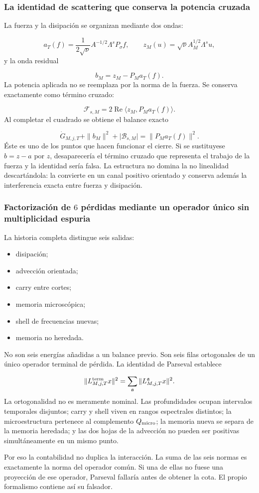 \subsubsection{La identidad de scattering que conserva la potencia cruzada}
La fuerza y la disipación se organizan mediante dos ondas:\par
\[
a_T(f)
=
\frac{1}{2\sqrt\nu}A^{-1/2}\Lambda^sP_\sigma f,
\qquad
z_M(u)=\sqrt\nu A_M^{1/2}\Lambda^su,
\]
y la onda residual\par
\[
b_M=z_M-P_Ma_T(f).
\]
La potencia aplicada no se reemplaza por la norma de la fuerza. Se conserva exactamente como término cruzado:\par
\[
\mathscr F_{s,M}
=
2\operatorname{Re}\langle z_M,P_Ma_T(f)\rangle.
\]
Al completar el cuadrado se obtiene el balance exacto\par
\[
\dot G_{M,j,T}
+\|b_M\|^2
+\lvert\mathscr B_{s,M}\rvert
=
\|P_Ma_T(f)\|^2.
\]
Éste es uno de los puntos que hacen funcionar el cierre. Si se sustituyese \(b=z-a\) por \(z\), desaparecería el término cruzado que representa el trabajo de la fuerza y la identidad sería falsa. La estructura no domina la no linealidad descartándola: la convierte en un canal positivo orientado y conserva además la interferencia exacta entre fuerza y disipación.\par
{}
\subsubsection{Factorización de \(6\) pérdidas mediante un operador único sin multiplicidad espuria}
La historia completa distingue seis salidas:\par
\begin{itemize}
\item disipación;
\item advección orientada;
\item carry entre cortes;
\item memoria microscópica;
\item shell de frecuencias nuevas;
\item memoria no heredada.
\end{itemize}
No son seis energías añadidas a un balance previo. Son seis filas ortogonales de un único operador terminal de pérdida. La identidad de Parseval establece\par
\[
\|L_{M,j,T}^{\rm term}x\|^2
=
\sum_{\mathfrak a}
\|L_{M,j,T}^{\mathfrak a}x\|^2.
\]
La ortogonalidad no es meramente nominal. Las profundidades ocupan intervalos temporales disjuntos; carry y shell viven en rangos espectrales distintos; la microestructura pertenece al complemento \(Q_{\rm micro}\); la memoria nueva se separa de la memoria heredada; y las dos hojas de la advección no pueden ser positivas simultáneamente en un mismo punto.\par
Por eso la contabilidad no duplica la interacción. La suma de las seis normas es exactamente la norma del operador común. Si una de ellas no fuese una proyección de ese operador, Parseval fallaría antes de obtener la cota. El propio formalismo contiene así su falsador.\par
{}
